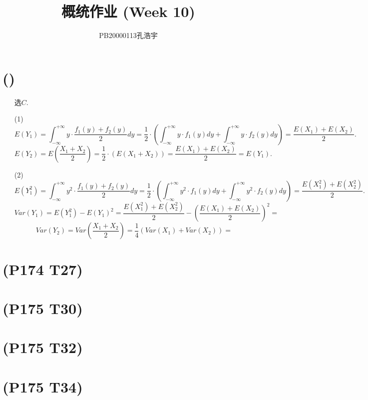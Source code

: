 \documentclass{article}
\title{概统作业 (Week 10)}
\author{PB20000113孔浩宇}
\begin{document}
\maketitle
\section{()}  %
\begin{enumerate}
    \item []选$C$.
    \item [(1)]
    \[
        E(Y_1) 
        = \int_{-\infty}^{+\infty} y \cdot \frac{f_{1} (y)+f_{2} (y)}{2} dy
        = \frac{1}{2}\cdot \left(\int_{-\infty}^{+\infty} y \cdot f_{1} (y) dy + \int_{-\infty}^{+\infty} y \cdot f_{2} (y) dy\right)
        = \frac{E(X_1) + E(X_2)}{2}.
    \]
    \[
        E(Y_2)
        = E\left(\frac{X_1 + X_2}{2}\right)
        = \frac{1}{2}\cdot \left(E(X_1 + X_2)\right)  
        = \frac{E(X_1) + E(X_2)}{2}
        = E(Y_1) .
    \]
    \item [(2)]
    \[
        E(Y_1^2)
        = \int_{-\infty}^{+\infty} y^2 \cdot \frac{f_{1} (y)+f_{2} (y)}{2} dy
        = \frac{1}{2}\cdot \left(\int_{-\infty}^{+\infty} y^2 \cdot f_{1} (y) dy + \int_{-\infty}^{+\infty} y^2 \cdot f_{2} (y) dy\right)
        = \frac{E(X_1^2) + E(X_2^2)}{2}.    
    \]
    \[
        Var(Y_1)
        = E(Y_1^2) - {E(Y_1)}^2   
        = \frac{E(X_1^2) + E(X_2^2)}{2} - {\left(\frac{E(X_1) + E(X_2)}{2}\right)}^2
        = 
    \]
    \[
        Var(Y_2)   
        = Var\left(\frac{X_1 + X_2}{2}\right) 
        = \frac{1}{4}\left( Var(X_1) + Var(X_2) \right)
        = 
    \]
\end{enumerate}

\section{(P174 T27)}  %


\section{(P175 T30)}  %


\section{(P175 T32)}  %


\section{(P175 T34)}  %
\end{document}
